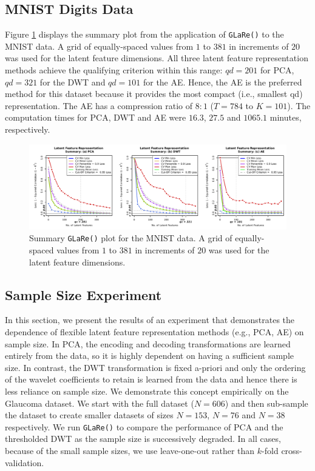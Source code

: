 \subsection{MNIST Digits Data}\label{sec:mnist-reults}

Figure \ref{fig:mnist-results} displays the summary plot from the application of \texttt{GLaRe()} to the MNIST data.
A grid of equally-spaced values from $1$ to $381$ in increments of $20$ was used for the latent feature dimensions.
All three latent feature representation methods achieve the qualifying criterion within this range: $qd = 201$ for PCA, $qd = 321$ for the DWT and $qd = 101$ for the AE.
Hence, the AE is the preferred method for this dataset because it provides the most compact (i.e., smallest qd) representation.
The AE has a compression ratio of $8:1$ ($T = 784$ to $K = 101$).
The computation times for PCA, DWT and AE were $16.3$, $27.5$ and $1065.1$ minutes, respectively.

\begin{figure}
    \centering
    \includegraphics[width=1\textwidth]{figures/mnist-results.pdf}
    \caption{Summary \texttt{GLaRe()} plot for the MNIST data. A grid of equally-spaced values from $1$ to $381$ in increments of $20$ was used for the latent feature dimensions.}
    \label{fig:mnist-results}
\end{figure}

\subsection{Sample Size Experiment}\label{sec:sample-size-experiment}

In this section, we present the results of an experiment that demonstrates the dependence of flexible latent feature representation methods (e.g., PCA, AE) on sample size.
In PCA, the encoding and decoding transformations are learned entirely from the data, so it is highly dependent on having a sufficient sample size.
In contrast, the DWT transformation is fixed a-priori and only the ordering of the wavelet coefficients to retain is learned from the data and hence there is less reliance on sample size.
We demonstrate this concept empirically on the Glaucoma dataset. 
We start with the full dataset ($N=606$) and then sub-sample the dataset to create smaller datasets of sizes $N=153$, $N=76$ and $N=38$ respectively.
We run \texttt{GLaRe()} to compare the performance of PCA and the thresholded DWT as the sample size is successively degraded.
In all cases, because of the small sample sizes, we use leave-one-out rather than $k$-fold cross-validation.

